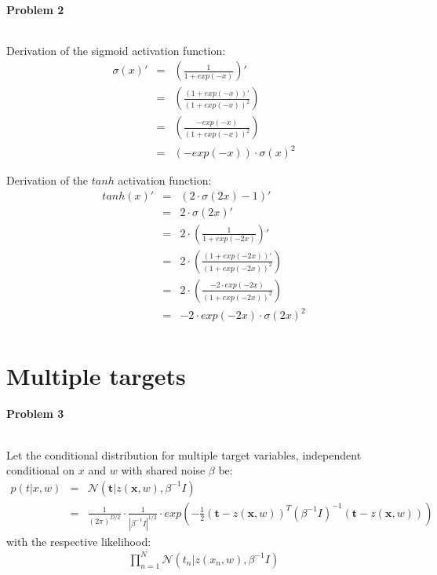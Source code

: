 \documentclass{article}
\renewcommand{\Vec}[1]{\ensuremath{\mathbf{#1}}}
\begin{document}
\paragraph*{Problem 2}
$\;$

Derivation of the sigmoid activation function:
\begin{eqnarray}
\sigma(x)' &=& \left( \frac{1}{1 + exp(-x)} \right)' \\
&=& \left( \frac{(1 + exp(-x))'}{(1 + exp(-x))^2} \right)\\
&=& \left( \frac{-exp(-x)}{(1 + exp(-x))^2} \right)\\
&=& (-exp(-x)) \cdot \sigma(x)^2
\end{eqnarray}

Derivation of the $tanh$ activation function:
\begin{eqnarray}
tanh(x)' &=& (2 \cdot \sigma(2x) -1)'\\
&=& 2 \cdot \sigma(2x)' \\
&=& 2 \cdot \left( \frac{1}{1 + exp(-2x)} \right)' \\
&=& 2 \cdot \left( \frac{(1 + exp(-2x))'}{(1 + exp(-2x))^2} \right)\\
&=& 2 \cdot \left( \frac{-2 \cdot exp(-2x)}{(1 + exp(-2x))^2} \right)\\
&=& -2 \cdot exp(-2x) \cdot \sigma(2x)^2\\
\end{eqnarray}

\section{Multiple targets}

\paragraph*{Problem 3}
$\;$ 

Let the conditional distribution for multiple target variables, independent conditional on $x$ and $w$ with shared noise $\beta$ be:
\begin{eqnarray}
p(t | x,w) &=& \mathcal{N}(\Vec{t} | z(\Vec{x},w), \beta^{-1}I)\\
&=& \frac{1}{(2\pi)^{D/2}}\cdot \frac{1}{|\beta^{-1}I |^{1/2}}\cdot exp \left( -\frac{1}{2} (\Vec{t}-z(\Vec{x},w))^T(\beta^{-1}I)^{-1}(\Vec{t}-z(\Vec{x},w))\right)
\end{eqnarray}
with the respective likelihood:
\begin{eqnarray}
\prod_{n=1}^N\mathcal{N}(t_n | z(x_n,w), \beta^{-1}I)
\end{eqnarray}
\end{document}
